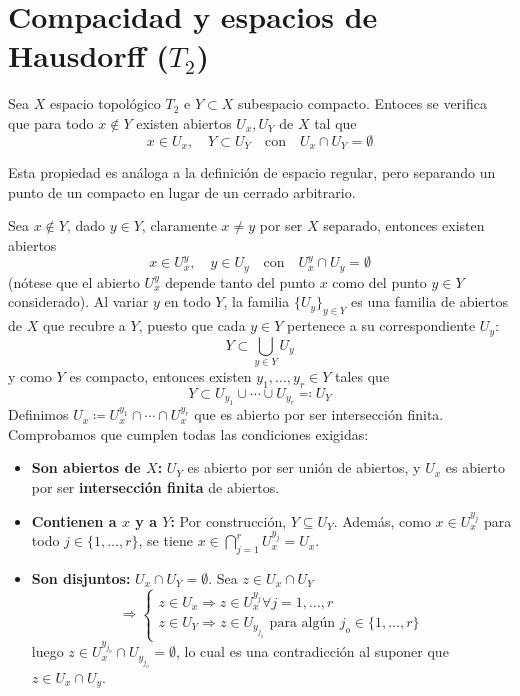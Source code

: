 \section{Compacidad y espacios de Hausdorff ($T_2$)}
\begin{prop}
Sea $X$ espacio topol\'ogico $T_2$ e $Y\subset X$ subespacio compacto. Entoces se verifica que para todo $x\nin Y$ existen abiertos $U_x, U_Y$ de $X$ tal que 
$$x\in U_x, \quad Y \subset U_Y \quad \text{con} \quad U_x\cap U_Y =\emptyset$$
\end{prop}
\begin{obs}
    Esta propiedad es análoga a la definición de espacio regular, pero separando un punto de un compacto en lugar de un cerrado arbitrario.
\end{obs}
\begin{dem}
Sea $x\nin Y$, dado $y\in Y$, claramente $x\neq y$ por ser $X$ separado, entonces existen abiertos 
$$x\in U_x^y, \quad y \in U_y \quad \text{con} \quad U_x^y \cap U_y =\emptyset$$
(nótese que el abierto $U_x^y$ depende tanto del punto $x$ como del punto $y\in Y$ considerado). Al variar $y$ en todo $Y$, la familia $\{U_y\}_{y \in Y}$ es una familia de abiertos de $X$ que recubre a $Y$, puesto que cada $y \in Y$ pertenece a su correspondiente $U_y$: 
$$Y\subset \bigcup_{y\in Y} U_y$$
y como $Y$ es compacto, entonces existen $y_1, \ldots, y_r \in Y$ tales que 
$$Y \subset U_{y_1}\cup \cdots \cup U_{y_r} \eqqcolon U_Y$$
Definimos
$U_x \coloneqq U_x^{y_1} \cap \cdots \cap U_x^{y_r}$ que es abierto por ser intersecci\'on finita. 
Comprobamos que cumplen todas las condiciones exigidas:
\begin{itemize}
    \item \textbf{Son abiertos de $X$:} $U_Y$ es abierto por ser unión de abiertos, y $U_x$ es abierto por ser \textbf{intersección finita} de abiertos.
    \item \textbf{Contienen a $x$ y a $Y$:} Por construcción, $Y \subseteq U_Y$. Además, como $x \in U_x^{y_j}$ para todo $j \in \{1, \dots, r\}$, se tiene $x \in \displaystyle \bigcap_{j=1}^r U_x^{y_j} = U_x$.
    \item \textbf{Son disjuntos:} $U_x\cap U_Y = \emptyset$. Sea $z\in U_x \cap U_Y$
    $$\Rightarrow \begin{cases}
        z\in U_x \Rightarrow z \in U_x^{y_j} \forall j=1,\ldots, r \\ z\in U_Y \Rightarrow z \in U_{y_{j_o}} \text{ para alg\'un } j_o \in \{1, \ldots, r\}
    \end{cases}$$
    luego $z\in U_x^{y_{j_o}}\cap U_{y_{j_o}} = \emptyset$, lo cual es una contradicci\'on al suponer que $z \in U_x \cap U_y$. 
\end{itemize}
\end{dem}

